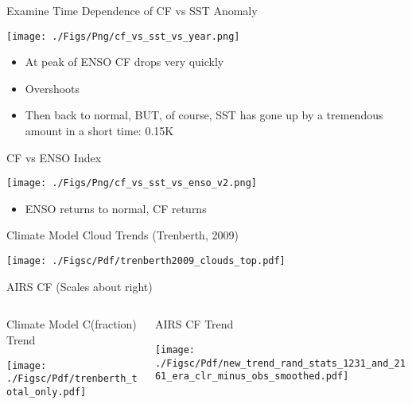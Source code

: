 \documentclass[10pt,t]{beamer}
\begin{document}
\begin{frame}[label={sec:org1b66617}]{Examine Time Dependence of CF vs SST Anomaly}
\vspace{-0.15in}
\begin{center}
\texttt{[image: ./Figs/Png/cf\_vs\_sst\_vs\_year.png]}
\end{center}

\vspace{-0.15in}
\footnotesize
\begin{itemize}
\item At peak of ENSO CF drops very quickly
\item Overshoots
\item Then back to normal, BUT, of course, SST has gone up by a tremendous amount in a short time: 0.15K
\end{itemize}
\end{frame}

\begin{frame}[label={sec:orgb37755f}]{CF vs ENSO Index}
\begin{center}
\texttt{[image: ./Figs/Png/cf\_vs\_sst\_vs\_enso\_v2.png]}
\end{center}

\footnotesize
\begin{itemize}
\item ENSO returns to normal, CF returns
\end{itemize}
\end{frame}

\begin{frame}[label={sec:orgd9a47e3}]{Climate Model Cloud Trends (Trenberth, 2009)}
\begin{center}
\texttt{[image: ./Figsc/Pdf/trenberth2009\_clouds\_top.pdf]}
\end{center}
\end{frame}

\begin{frame}[label={sec:orgaf042e2}]{AIRS CF (Scales about right)}
\begin{columns}
\begin{column}{0.55\columnwidth}
\begin{block}{Climate Model C(fraction) Trend}
\vspace{-0.15in}
\begin{center}
\texttt{[image: ./Figsc/Pdf/trenberth\_total\_only.pdf]}
\end{center}
\end{block}
\end{column}


\begin{column}{0.55\columnwidth}
\begin{block}{AIRS CF Trend}
\begin{center}
\texttt{[image: ./Figsc/Pdf/new\_trend\_rand\_stats\_1231\_and\_2161\_era\_clr\_minus\_obs\_smoothed.pdf]}
\end{center}
\end{block}
\end{column}
\end{columns}
\end{frame}
\end{document}
